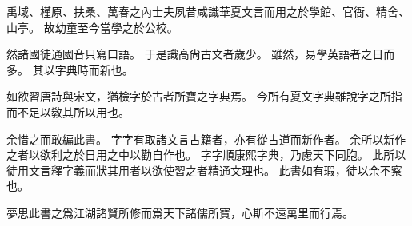 禹域、槿原、扶桑、萬春之內士夫夙昔咸識華夏文言而用之於學館、官衙、精舍、山亭。
故幼童至今當學之於公校。

然諸國徒通國音只寫口語。
于是識高尙古文者歲少。
雖然，易學英語者之日而多。
其以字典時而新也。

如欲習唐詩與宋文，猶檢字於古者所寶之字典焉。
今所有夏文字典雖說字之所指而不足以敎其所以用也。

余惜之而敢編此書。
字字有取諸文言古籍者，亦有從古道而新作者。
余所以新作之者以欲利之於日用之中以勸自作也。
字字順康熙字典，乃慮天下同胞。
此所以徒用文言釋字義而狀其用者以欲使習之者精通文理也。
此書如有瑕，徒以余不察也。

夢思此書之爲江湖諸賢所修而爲天下諸儒所寶，心斯不遠萬里而行焉。
